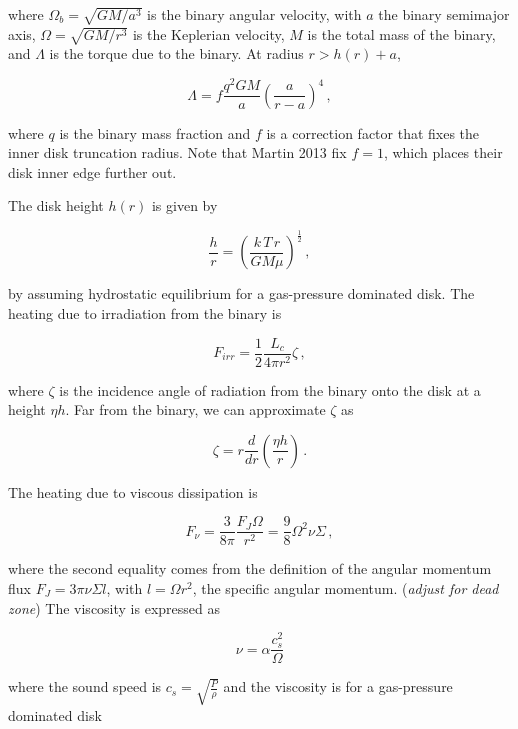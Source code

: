 \documentclass{article}
\begin{document}
where $\Omega_b = \sqrt{G M/a^3}$ is the binary angular velocity, with $a$ the binary semimajor axis, $\Omega = \sqrt{G M/r^{3}}$ is the Keplerian velocity, $M$ is the total mass of the binary, and $\Lambda$ is the torque due to the binary. At radius $r > h(r) + a$,

\begin{equation}
\Lambda = f \frac{q^2 GM}{a} \left(\frac{a}{r-a}\right)^4\,,
\end{equation}

where $q$ is the binary mass fraction and $f$ is a correction factor that fixes the inner disk truncation radius. Note that Martin 2013 fix $f =1$, which places their disk inner edge further out. 

The disk height $h(r)$ is given by

\begin{equation}
\frac{h}{r} = \left(\frac{k\,T\,r}{G M\mu}\right)^\frac{1}{2} \,,
\end{equation}

by assuming hydrostatic equilibrium for a gas-pressure dominated disk.
The heating due to irradiation from the binary is

\begin{equation}
F_{irr} = \frac{1}{2} \frac{L_c}{4\pi r^2} \zeta\,,
\end{equation}

where $\zeta$ is the incidence angle of radiation from the binary onto the disk at a height $\eta h$. Far from the binary, we can approximate $\zeta$ as

\begin{equation}
\zeta = r \frac{d}{dr} \left(\frac{\eta h}{r}\right)\,.
\end{equation}

The heating due to viscous dissipation is

\begin{equation}
F_\nu = \frac{3}{8\pi} \frac{F_J \Omega}{r^2} = \frac{9}{8} \Omega^2 \nu \Sigma\,,
\end{equation}

where the second equality comes from the definition of the angular momentum flux $F_J = 3 \pi \nu \Sigma l$, with $l = \Omega r^2$, the specific angular momentum. (\textit{adjust for dead zone}) The viscosity is expressed as

\begin{equation}
\nu = \alpha \frac{c_s^2}{\Omega}
\end{equation}

where the sound speed is $c_s = \sqrt{\frac{P}{\rho}}$ and the viscosity is for a gas-pressure dominated disk 
 
\end{document}
